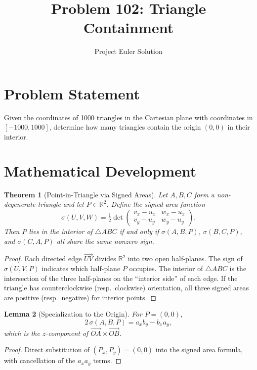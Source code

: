 \documentclass[12pt]{article}
\title{Problem 102: Triangle Containment}
\author{Project Euler Solution}
\date{}
\newtheorem{theorem}{Theorem}
\newtheorem{lemma}[theorem]{Lemma}
\begin{document}
\maketitle

\section{Problem Statement}

Given the coordinates of 1000 triangles in the Cartesian plane with coordinates in $[-1000, 1000]$, determine how many triangles contain the origin $(0,0)$ in their interior.

\section{Mathematical Development}

\begin{theorem}[Point-in-Triangle via Signed Areas]
\label{thm:pit}
Let $A, B, C$ form a non-degenerate triangle and let $P \in \mathbb{R}^2$. Define the signed area function
\[
\sigma(U, V, W) = \tfrac{1}{2}\det\!\begin{pmatrix} v_x - u_x & w_x - u_x \\ v_y - u_y & w_y - u_y \end{pmatrix}.
\]
Then $P$ lies in the interior of $\triangle ABC$ if and only if $\sigma(A,B,P)$, $\sigma(B,C,P)$, and $\sigma(C,A,P)$ all share the same nonzero sign.
\end{theorem}

\begin{proof}
Each directed edge $\overrightarrow{UV}$ divides $\mathbb{R}^2$ into two open half-planes. The sign of $\sigma(U, V, P)$ indicates which half-plane $P$ occupies. The interior of $\triangle ABC$ is the intersection of the three half-planes on the ``interior side'' of each edge. If the triangle has counterclockwise (resp.\ clockwise) orientation, all three signed areas are positive (resp.\ negative) for interior points.
\end{proof}

\begin{lemma}[Specialization to the Origin]
For $P = (0,0)$,
\[
2\,\sigma(A, B, P) = a_x b_y - b_x a_y,
\]
which is the $z$-component of $\vec{OA} \times \vec{OB}$.
\end{lemma}

\begin{proof}
Direct substitution of $(P_x, P_y) = (0,0)$ into the signed area formula, with cancellation of the $a_x a_y$ terms.
\end{proof}
\end{document}
